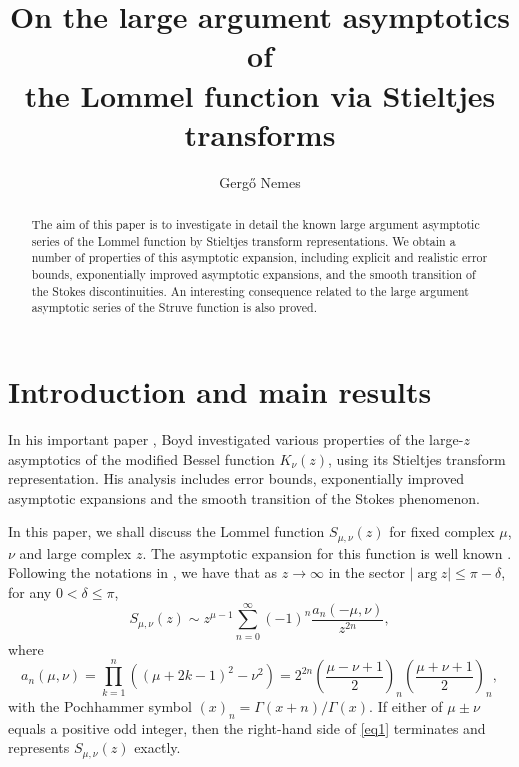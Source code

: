 \documentclass[a4paper,twoside,10pt]{amsart}
\author[G. Nemes]{Gerg\H{o} Nemes}
\numberwithin{equation}{section}
\begin{document}
\title[Asymptotics of the Lommel function]{On the large argument asymptotics of\\ the Lommel function via Stieltjes transforms}

\begin{abstract} The aim of this paper is to investigate in detail the known large argument asymptotic series of the Lommel function by Stieltjes transform representations. We obtain a number of properties of this asymptotic expansion, including explicit and realistic error bounds, exponentially improved asymptotic expansions, and the smooth transition of the Stokes discontinuities. An interesting consequence related to the large argument asymptotic series of the Struve function is also proved.
\end{abstract}
\maketitle

\section{Introduction and main results}\label{section1}

In his important paper \cite{Boyd}, Boyd investigated various properties of the large-$z$ asymptotics of the modified Bessel function $K_\nu\left(z\right)$, using its Stieltjes transform representation. His analysis includes error bounds, exponentially improved asymptotic expansions and the smooth transition of the Stokes phenomenon.

In this paper, we shall discuss the Lommel function $S_{\mu ,\nu } \left( z \right)$ for fixed complex $\mu$, $\nu$ and large complex $z$. The asymptotic expansion for this function is well known \cite[11.9.iii]{NIST}. Following the notations in \cite{NIST}, we have that as $z \to \infty$ in the sector $\left|\arg z\right| \leq \pi -\delta$, for any $0< \delta \leq \pi$,
\begin{equation}\label{eq1}
S_{\mu ,\nu } \left( z \right) \sim z^{\mu  - 1} \sum\limits_{n = 0}^\infty  {\left( { - 1} \right)^n \frac{{a_n \left( { - \mu ,\nu } \right)}}{{z^{2n} }}},
\end{equation}
where
\[
a_n \left( {\mu ,\nu } \right) = \prod\limits_{k = 1}^n {\left( {\left( {\mu  + 2k - 1} \right)^2  - \nu ^2 } \right)}  = 2^{2n} \left( {\frac{{\mu  - \nu  + 1}}{2}} \right)_n \left( {\frac{{\mu  + \nu  + 1}}{2}} \right)_n ,
\]
with the Pochhammer symbol $\left( x \right)_n  = \Gamma \left( {x + n} \right)/\Gamma \left( x \right)$. If either of $\mu\pm\nu$ equals a positive odd integer, then the right-hand side of \eqref{eq1} terminates and represents $S_{\mu ,\nu } \left( z \right)$ exactly.
\end{document}
